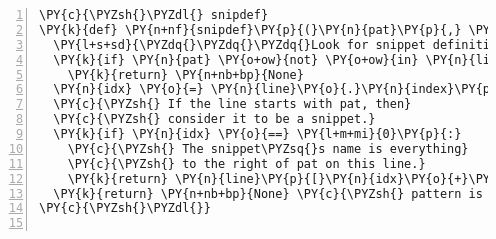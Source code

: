 \begin{Verbatim}[commandchars=\\\{\},numbers=left,numbersep=0.5em]
\PY{c}{\PYZsh{}\PYZdl{} snipdef}
\PY{k}{def} \PY{n+nf}{snipdef}\PY{p}{(}\PY{n}{pat}\PY{p}{,} \PY{n}{line}\PY{p}{)}\PY{p}{:}
  \PY{l+s+sd}{\PYZdq{}\PYZdq{}\PYZdq{}Look for snippet definitions on a line.\PYZdq{}\PYZdq{}\PYZdq{}}
  \PY{k}{if} \PY{n}{pat} \PY{o+ow}{not} \PY{o+ow}{in} \PY{n}{line}\PY{p}{:}
    \PY{k}{return} \PY{n+nb+bp}{None}
  \PY{n}{idx} \PY{o}{=} \PY{n}{line}\PY{o}{.}\PY{n}{index}\PY{p}{(}\PY{n}{pat}\PY{p}{)}
  \PY{c}{\PYZsh{} If the line starts with pat, then}
  \PY{c}{\PYZsh{} consider it to be a snippet.}
  \PY{k}{if} \PY{n}{idx} \PY{o}{==} \PY{l+m+mi}{0}\PY{p}{:}
    \PY{c}{\PYZsh{} The snippet\PYZsq{}s name is everything}
    \PY{c}{\PYZsh{} to the right of pat on this line.}
    \PY{k}{return} \PY{n}{line}\PY{p}{[}\PY{n}{idx}\PY{o}{+}\PY{n+nb}{len}\PY{p}{(}\PY{n}{pat}\PY{p}{)}\PY{p}{:}\PY{p}{]}\PY{o}{.}\PY{n}{strip}\PY{p}{(}\PY{p}{)}
  \PY{k}{return} \PY{n+nb+bp}{None} \PY{c}{\PYZsh{} pattern is in line but not snippet}
\PY{c}{\PYZsh{}\PYZdl{}}
      

\end{Verbatim}
